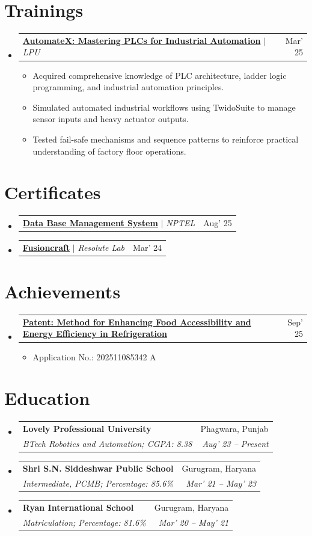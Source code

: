 \documentclass[letterpaper,10pt]{article}
\makeatletter
\newcommand{\resumeItem}[1]{\item\small{#1 \vspace{-2pt}}}
\newcommand{\resumeSubheading}[4]{
  \vspace{-2pt}\item
    \begin{tabular*}{0.97\textwidth}[t]{@{}l @{\extracolsep{\fill}} r@{}}
      \textbf{#1} & #2 \\
      \textit{\small#3} & \textit{\small #4} \\
    \end{tabular*}
  \vspace{-7pt}
}
\newcommand{\resumeProjectHeading}[2]{
    \item
    \begin{tabular*}{0.97\textwidth}{@{}l @{\extracolsep{\fill}} r@{}}
      \small#1 & #2 \\
    \end{tabular*}
    \vspace{-7pt}
}
\newcommand{\resumeAchievementHeading}[2]{
    \item
    \begin{tabular*}{0.97\textwidth}[t]{@{}p{0.85\textwidth} @{\extracolsep{\fill}} r@{}}
      \small#1 & #2 \\
    \end{tabular*}
    \vspace{-7pt}
}
\newcommand{\resumeSubHeadingListStart}{\begin{itemize}[leftmargin=0.15in, label={}]}
\newcommand{\resumeSubHeadingListEnd}{\end{itemize}\vspace{-2pt}}
\newcommand{\resumeItemListStart}{\begin{itemize}}
\newcommand{\resumeItemListEnd}{\end{itemize}\vspace{-5pt}}
\makeatother
\begin{document}
\section{Trainings}
  \resumeSubHeadingListStart
    \resumeProjectHeading
      {\textbf{\href{https://drive.google.com/file/d/1PUqcvq8SkgS4APbpqYSwzsYsXNxvOywR/view?usp=drive_link}{AutomateX: Mastering PLCs for Industrial Automation}} $|$ \emph{LPU}}{Mar' 25}
      \resumeItemListStart
        \resumeItem{Acquired comprehensive knowledge of PLC architecture, ladder logic programming, and industrial automation principles.}
        \resumeItem{Simulated automated industrial workflows using TwidoSuite to manage sensor inputs and heavy actuator outputs.}
        \resumeItem{Tested fail-safe mechanisms and sequence patterns to reinforce practical understanding of factory floor operations.}
      \resumeItemListEnd
  \resumeSubHeadingListEnd

\section{Certificates}
    \resumeSubHeadingListStart
      \resumeProjectHeading
        {\textbf{\href{https://drive.google.com/file/d/1cPZTNh-I-6y_1j0XR1dyLbr4Padv7GvN/view?usp=drive_link}{Data Base Management System}} $|$ \emph{NPTEL}}{Aug' 25}
      \resumeProjectHeading
        {\textbf{\href{https://drive.google.com/file/d/16txdJfMjoQ9aB_c2yHVEDFoT7vu3QOEp/view?usp=drive_link}{Fusioncraft}} $|$ \emph{Resolute Lab}}{Mar' 24}
    \resumeSubHeadingListEnd

\section{Achievements}
    \resumeSubHeadingListStart
      \resumeAchievementHeading
        {\textbf{\href{https://drive.google.com/file/d/1PNy_NGYBe1Dt2zS2FtCkgpTa2ak69WHM/view?usp=drive_link}{Patent: Method for Enhancing Food Accessibility and Energy Efficiency in Refrigeration}}}{Sep' 25}
      \vspace{-2pt}
      \resumeItemListStart
        \resumeItem{Application No.: 202511085342 A}
      \resumeItemListEnd
    \resumeSubHeadingListEnd

\section{Education}
  \resumeSubHeadingListStart
    \resumeSubheading
      {Lovely Professional University}{Phagwara, Punjab}
      {BTech Robotics and Automation; CGPA: 8.38}{Aug' 23 -- Present}
    \resumeSubheading
      {Shri S.N. Siddeshwar Public School}{Gurugram, Haryana}
      {Intermediate, PCMB; Percentage: 85.6\%}{Mar' 21 -- May' 23}
    \resumeSubheading
      {Ryan International School}{Gurugram, Haryana}
      {Matriculation; Percentage: 81.6\%}{Mar' 20 -- May' 21}
  \resumeSubHeadingListEnd
\end{document}
